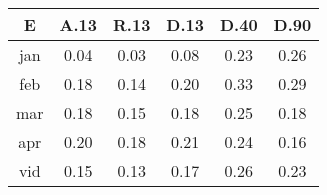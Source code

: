 \begin{tabular}{ | c | c c c c c | }\hline
E	&A.13	&R.13	&D.13	&D.40	&D.90\\ \hline
jan		&0.04	&0.03	&0.08	&0.23	&0.26\\
feb		&0.18	&0.14	&0.20	&0.33	&0.29\\
mar		&0.18	&0.15	&0.18	&0.25	&0.18\\
apr		&0.20	&0.18	&0.21	&0.24	&0.16\\ \hline
vid		&0.15	&0.13	&0.17	&0.26	&0.23\\ \hline
\end{tabular}